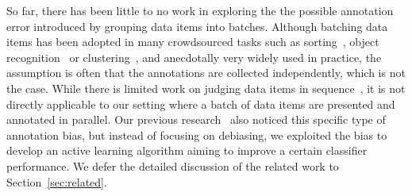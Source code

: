 So far, there has been little to no work in exploring the 
the possible annotation error introduced by grouping 
data items into batches.
Although batching data items has been adopted in many crowdsourced tasks such as
sorting~\cite{marcus:vldb2011}, object recognition~\cite{su:aaai2012} or clustering~\cite{gomes:nips2011}, 
and anecdotally very widely used in practice,   
the assumption is often 
that the annotations are collected independently, which is not the case.
While there is limited work on judging data items in sequence~\cite{mozer:nips2010,scholer:sigir2013,scholer:sigir2011},
it is not directly applicable to our setting where a batch of data items are presented and annotated in parallel.
Our previous research~\cite{zhuang:wsdm2015} also noticed this specific type of annotation bias,
but instead of focusing on debiasing,
we exploited the bias to develop an active learning algorithm aiming to improve a certain classifier performance.
We defer the detailed discussion of the related work to Section~\ref{sec:related}.



